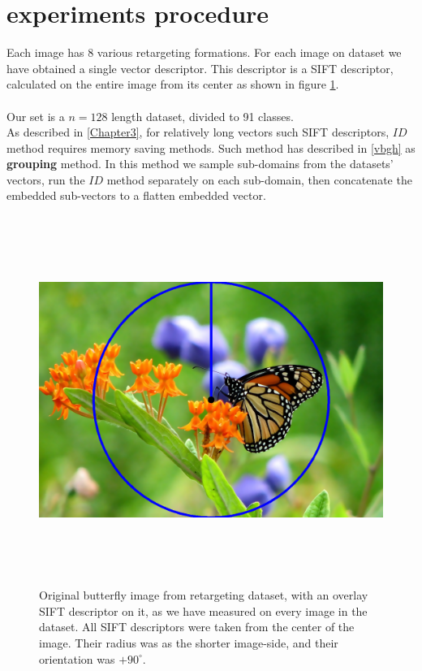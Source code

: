 \section{experiments procedure}

Each image has 8 various retargeting formations. For each image on dataset we have obtained a single vector descriptor. This descriptor is a SIFT descriptor, calculated on the entire image from its center as shown in figure \ref{single_sift}. 
\\ \\ 
Our set is a $n=128$ length dataset, divided to 91 classes.\\
As described in \ref{Chapter3}, for relatively long vectors such SIFT descriptors, $ID$ method requires memory saving methods. Such method has described in \ref{vbgh} as \textbf{grouping} method. In this method we sample sub-domains from the datasets' vectors, run the $ID$ method separately on each sub-domain, then concatenate the embedded sub-vectors to a flatten embedded vector.\\ 


\begin{figure}[h] \label{single_sift}
	
	\includegraphics[width=\linewidth,height=12cm,keepaspectratio]{Figures/butterfly_sift}
	\caption[image single sift descriptor]
	{Original butterfly image from retargeting dataset, with an overlay SIFT descriptor on it, as we have measured on every image in the dataset. All SIFT descriptors were taken from the center of the image. Their radius was as the shorter image-side, and their orientation was $+90^{\circ}$.}
	
\end{figure}


